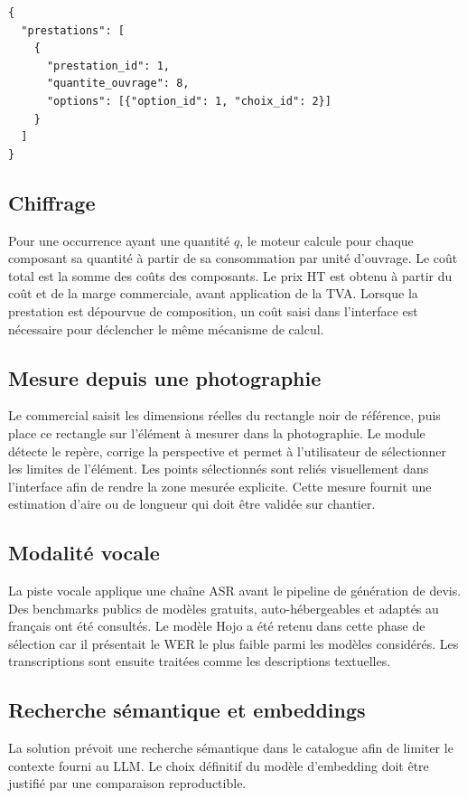 \begin{verbatim}
{
  "prestations": [
    {
      "prestation_id": 1,
      "quantite_ouvrage": 8,
      "options": [{"option_id": 1, "choix_id": 2}]
    }
  ]
}
\end{verbatim}

\subsection{Chiffrage}
Pour une occurrence ayant une quantité $q$, le moteur calcule pour chaque composant sa quantité à partir de sa consommation par unité d'ouvrage. Le coût total est la somme des coûts des composants. Le prix HT est obtenu à partir du coût et de la marge commerciale, avant application de la TVA. Lorsque la prestation est dépourvue de composition, un coût saisi dans l'interface est nécessaire pour déclencher le même mécanisme de calcul.

\subsection{Mesure depuis une photographie}
Le commercial saisit les dimensions réelles du rectangle noir de référence, puis place ce rectangle sur l'élément à mesurer dans la photographie. Le module détecte le repère, corrige la perspective et permet à l'utilisateur de sélectionner les limites de l'élément. Les points sélectionnés sont reliés visuellement dans l'interface afin de rendre la zone mesurée explicite. Cette mesure fournit une estimation d'aire ou de longueur qui doit être validée sur chantier.

\subsection{Modalité vocale}
La piste vocale applique une chaîne ASR avant le pipeline de génération de devis. Des benchmarks publics de modèles gratuits, auto-hébergeables et adaptés au français ont été consultés. Le modèle Hojo a été retenu dans cette phase de sélection car il présentait le WER le plus faible parmi les modèles considérés. Les transcriptions sont ensuite traitées comme les descriptions textuelles.

\subsection{Recherche sémantique et embeddings}
La solution prévoit une recherche sémantique dans le catalogue afin de limiter le contexte fourni au LLM. Le choix définitif du modèle d'embedding doit être justifié par une comparaison reproductible.

